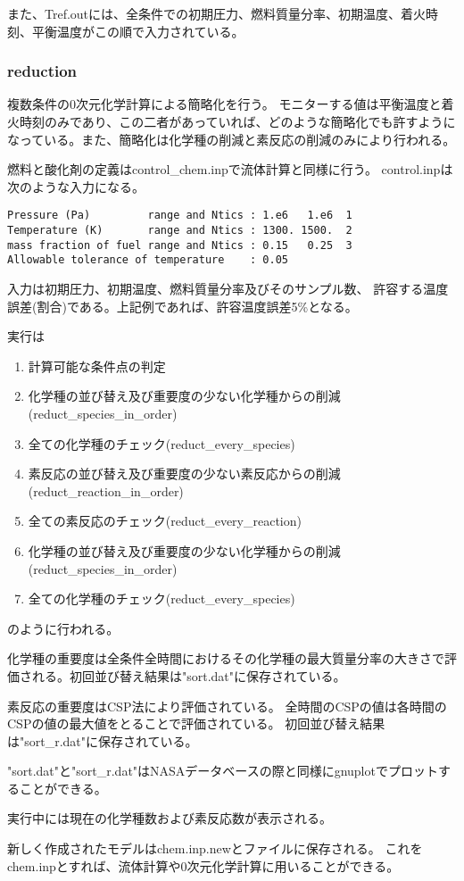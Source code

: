 \documentclass{jsarticle}
\begin{document}
また、Tref.outには、全条件での初期圧力、燃料質量分率、初期温度、着火時刻、平衡温度がこの順で入力されている。
\subsubsection{reduction}%
複数条件の0次元化学計算による簡略化を行う。
モニターする値は平衡温度と着火時刻のみであり、この二者があっていれば、どのような簡略化でも許すようになっている。また、簡略化は化学種の削減と素反応の削減のみにより行われる。

燃料と酸化剤の定義はcontrol\_chem.inpで流体計算と同様に行う。
control.inpは次のような入力になる。
\begin{verbatim}
Pressure (Pa)         range and Ntics : 1.e6   1.e6  1
Temperature (K)       range and Ntics : 1300. 1500.  2
mass fraction of fuel range and Ntics : 0.15   0.25  3
Allowable tolerance of temperature    : 0.05
\end{verbatim}
入力は初期圧力、初期温度、燃料質量分率及びそのサンプル数、
許容する温度誤差(割合)である。上記例であれば、許容温度誤差5\%となる。

実行は
\begin{enumerate}
\item 計算可能な条件点の判定
\item 化学種の並び替え及び重要度の少ない化学種からの削減(reduct\_species\_in\_order)
\item 全ての化学種のチェック(reduct\_every\_species)
\item 素反応の並び替え及び重要度の少ない素反応からの削減(reduct\_reaction\_in\_order)
\item 全ての素反応のチェック(reduct\_every\_reaction)
\item 化学種の並び替え及び重要度の少ない化学種からの削減(reduct\_species\_in\_order)
\item 全ての化学種のチェック(reduct\_every\_species)
\end{enumerate}
のように行われる。

化学種の重要度は全条件全時間におけるその化学種の最大質量分率の大きさで評価される。初回並び替え結果は"sort.dat"に保存されている。

素反応の重要度はCSP法により評価されている。
全時間のCSPの値は各時間のCSPの値の最大値をとることで評価されている。
初回並び替え結果は"sort\_r.dat"に保存されている。

"sort.dat"と"sort\_r.dat"はNASAデータベースの際と同様にgnuplotでプロットすることができる。

実行中には現在の化学種数および素反応数が表示される。

新しく作成されたモデルはchem.inp.newとファイルに保存される。
これをchem.inpとすれば、流体計算や0次元化学計算に用いることができる。
\newpage

%
%
\end{document}
